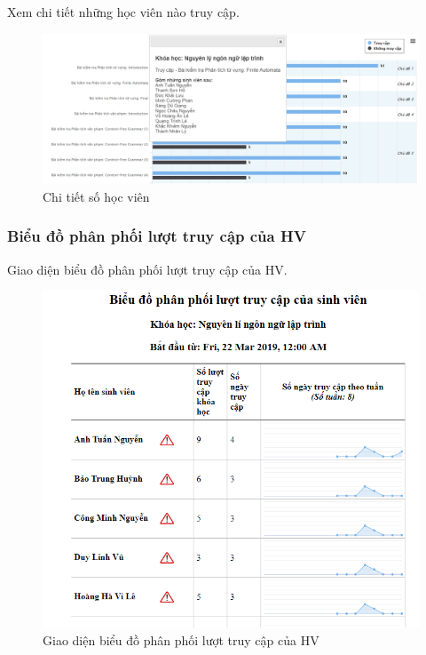 \vskip 5cm
Xem chi tiết những học viên nào truy cập.

\begin{center}
	\begin{figure}[htp]
		\begin{center}
			\includegraphics[width=1\linewidth]{img/28}
		\end{center}
		\caption{Chi tiết số học viên}
		\label{refhinh60}
	\end{figure}
\end{center}

\newpage
\subsubsection*{Biểu đồ phân phối lượt truy cập của HV}

Giao diện biểu đồ phân phối lượt truy cập của HV.

\begin{center}
	\begin{figure}[htp]
		\begin{center}
			\includegraphics[width=1\linewidth]{img/29}
		\end{center}
		\caption{Giao diện biểu đồ phân phối lượt truy cập của HV}
		\label{refhinh61}
	\end{figure}
\end{center}


